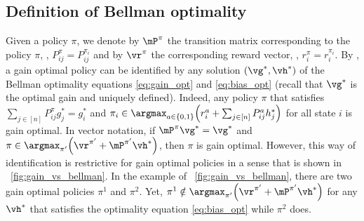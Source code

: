 \subsection{Definition of Bellman optimality}

Given a policy $\pi$, we denote by $\mP^\pi$ the transition matrix corresponding to the policy $\pi$, \ie, $P^\pi_{ij}=P^{\pi_i}_{ij}$ and by $\vr^\pi$ the corresponding reward vector, \ie, $r^\pi_i{=}r^{\pi_i}_i$.
By \cite[Theorem~9.1.7]{puterman2014markov}, a gain optimal policy can be identified by any solution $(\vg^*, \vh^*)$ of the Bellman optimality equations \eqref{eq:gain_opt} and \eqref{eq:bias_opt} (recall that $\vg^*$ is the optimal gain and uniquely defined).
Indeed, any policy $\pi$ that satisfies $\sum_{j\in[n]}P^{\pi}_{ij}g^*_j=g^*_i$ and $\pi_i\in\argmax_{a\in\{0,1\}}\Big(r^a_i +\sum_{j\in[n]}P^a_{ij}h^*_j\Big)$ for all state $i$ is gain optimal.
In vector notation, if $\mP^{\pi}\vg^*=\vg^*$ and $\pi\in\argmax_{\pi'}\Bigl(\vr^{\pi'}+\mP^{\pi'}\vh^*\Bigr)$, then $\pi$ is gain optimal.
However, this way of identification is restrictive for gain optimal policies in a sense that is shown
in \figurename~\ref{fig:gain_vs_bellman}.
In the example of \figurename~\ref{fig:gain_vs_bellman}, there are two gain optimal policies $\pi^1$ and $\pi^2$.
Yet, $\pi^1\notin\argmax_{\pi'}\Bigl(\vr^{\pi'}+\mP^{\pi'}\vh^*\Bigr)$ for any $\vh^*$ that satisfies the optimality equation \eqref{eq:bias_opt} while $\pi^2$ does.

